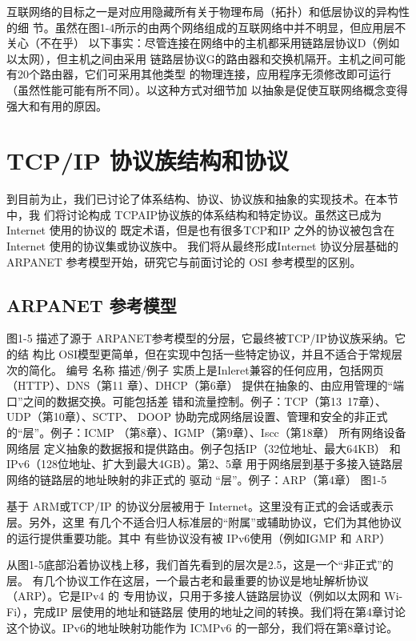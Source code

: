 互联网络的目标之一是对应用隐藏所有关于物理布局（拓扑）和低层协议的异构性的细
节。虽然在图1-4所示的由两个网络组成的互联网络中并不明显，但应用层不关心（不在乎）
以下事实：尽管连接在网络中的主机都采用链路层协议D（例如以太网），但主机之间由采用
链路层协议G的路由器和交换机隔开。主机之间可能有20个路由器，它们可采用其他类型
的物理连接，应用程序无须修改即可运行（虽然性能可能有所不同）。以这种方式对细节加
以抽象是促使互联网络概念变得强大和有用的原因。

\section{TCP/IP 协议族结构和协议}
到目前为止，我们已讨论了体系结构、协议、协议族和抽象的实现技术。在本节中，我
们将讨论构成 TCPAIP协议族的体系结构和特定协议。虽然这已成为 Internet 使用的协议的
既定术语，但是也有很多TCP和IP 之外的协议被包含在Internet 使用的协议集或协议族中。
我们将从最终形成Internet 协议分层基础的ARPANET 参考模型开始，研究它与前面讨论的
OSI 参考模型的区别。

\subsection{ARPANET 参考模型}

图1-5 描述了源于 ARPANET参考模型的分层，它最终被TCP/IP协议族采纳。它的结
构比 OSI模型更简单，但在实现中包括一些特定协议，并且不适合于常规层次的简化。
编号
名称
描述/例子
实质上是Inleret兼容的任何应用，包括网页（HTTP）、DNS（第11
章）、DHCP（第6章）
提供在抽象的、由应用管理的“端口”之间的数据交换。可能包括差
错和流量控制。例子：TCP（第13~17章）、UDP（第10章）、SCTP、
DOOP
协助完成网络层设置、管理和安全的非正式的“层”。例子：ICMP
（第8章）、IGMP（第9章）、Iscc（第18章）
所有网络设备
网络层
定义抽象的数据报和提供路由。例子包括IP（32位地址、最大64KB）
和IPv6（128位地址、扩大到最大4GB）。第2、5章
用于网络层到基于多接入链路层网络的链路层的地址映射的非正式的
驱动
“层”。例子：ARP（第4章）
图1-5

基于 ARM或TCP/IP 的协议分层被用于 Internet。这里没有正式的会话或表示层。另外，这里
有几个不适合归人标准层的“附属”或辅助协议，它们为其他协议的运行提供重要功能。其中
有些协议没有被 IPv6使用（例如IGMP 和 ARP）

从图1-5底部沿着协议栈上移，我们首先看到的层次是2.5，这是一个“非正式”的层。
有几个协议工作在这层，一个最古老和最重要的协议是地址解析协议（ARP）。它是IPv4 的
专用协议，只用于多接人链路层协议（例如以太网和 Wi-Fi），完成IP 层使用的地址和链路层
使用的地址之间的转换。我们将在第4章讨论这个协议。IPv6的地址映射功能作为 ICMPv6
的一部分，我们将在第8章讨论。

